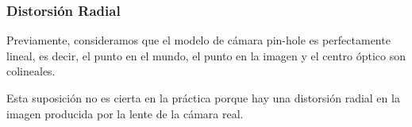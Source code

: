 \begin{frame}
    \frametitle{Distorsión Radial}
    
    \footnotesize
    
    Previamente, consideramos que el modelo de cámara pin-hole es perfectamente lineal, es decir, el punto en el mundo, el punto en la imagen y el centro óptico son colineales.
    
    Esta suposición no es cierta en la práctica porque hay una distorsión radial en la imagen producida por la lente de la cámara real.
    
    \begin{figure}[!h]
        \centering
    \end{figure}
    
\end{frame}

